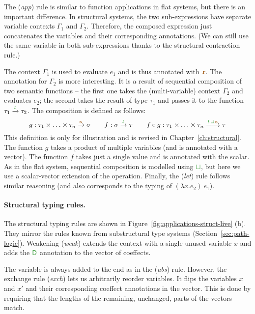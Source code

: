 The (\emph{app}) rule is similar to function applications in flat systems, but there is an important
difference. In structural systems, the two sub-expressions have separate variable contexts
$\Gamma_1$ and $\Gamma_2$. Therefore, the composed expression just concatenates the variables
and their corresponding annotations. (We can still use the same variable in both sub-expressions
thanks to the structural contraction rule.)

The context $\Gamma_1$ is used to evaluate $e_1$ and is thus annotated with $\aclrd{\mathbf{r}}$.
The annotation for $\Gamma_2$ is more interesting. It is a result of sequential composition of two
semantic functions -- the first one takes the (multi-variable) context $\Gamma_2$ and evaluates
$e_2$; the second takes the result of type $\tau_1$ and passes it to the function $\tau_1 \xrightarrow{\cclrd{t}} \tau_2$.
The composition is defined as follows:
%
\begin{equation*}
g : \tau_1 \times \ldots \times \tau_n \xrightarrow{\aclrd{\mathbf{s}}} \sigma
\qquad
f : \sigma \xrightarrow{\cclrd{t}} \tau
\qquad
f \circ g : \tau_1 \times \ldots \times \tau_n \xrightarrow{\cclrd{t} \,\cclrd{\sqcup}\, \aclrd{\mathbf{s}}} \tau
\end{equation*}
%
This definition is only for illustration and is revised in Chapter~\ref{ch:structural}. The function
$g$ takes a product of multiple variables (and is annotated with a vector). The function $f$ takes
just a single value and is annotated with the scalar. As in the flat system, sequential composition
is modelled using $\cclrd{\sqcup}$, but here we use a scalar-vector extension of the operation. Finally,
the (\emph{let}) rule follows similar reasoning (and also corresponds to the typing of $(\lambda x.e_2)~e_1$).

\paragraph{Structural typing rules.}
The structural typing rules are shown in Figure~\ref{fig:applications-struct-live} (b). They mirror
the rules known from substructural type systems (Section~\ref{sec:path-logic}). Weakening (\emph{weak})
extends the context with a single unused variable $x$ and adds the $\cclrd{\ident{D}}$ annotation to the
vector of coeffects.

The variable is always added to the end as in the (\emph{abs}) rule. However, the exchange rule
(\emph{exch}) lets us arbitrarily reorder variables. It flips the variables $x$ and $x'$ and their
corresponding coeffect annotations in the vector. This is done by requiring that the lengths of the
remaining, unchanged, parts of the vectors match.

